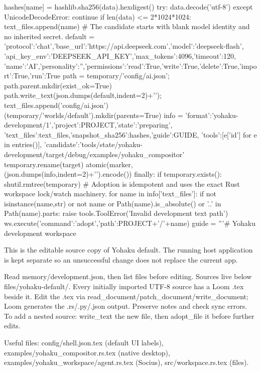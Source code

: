                 hashes[name] = hashlib.sha256(data).hexdigest()
                try: data.decode('utf-8')
                except UnicodeDecodeError: continue
                if len(data) <= 2*1024*1024: text_files.append(name)
            # The candidate starts with blank model identity and no inherited secret.
            default = {'protocol':'chat','base_url':'https://api.deepseek.com','model':'deepseek-flash',
                       'api_key_env':'DEEPSEEK_API_KEY','max_tokens':4096,'timeout':120,
                       'name':'AI','personality':'','permissions':{'read':True,'write':True,'delete':True,'import':True,'run':True}}
            path = temporary/'config/ai.json'; path.parent.mkdir(exist_ok=True)
            path.write_text(json.dumps(default,indent=2)+'\n'); text_files.append('config/ai.json')
            (temporary/'worlds/default').mkdir(parents=True)
            info = {'format':'yohaku-development/1','project':PROJECT,'state':'preparing',
                    'text_files':text_files,'snapshot_sha256':hashes,'guide':GUIDE,
                    'tools':[e['id'] for e in entries()],
                    'candidate':'tools/state/yohaku-development/target/debug/examples/yohaku_compositor'}
            temporary.rename(target)
            atomic(marker, (json.dumps(info,indent=2)+'\n').encode())
        finally:
            if temporary.exists(): shutil.rmtree(temporary)
    # Adoption is idempotent and uses the exact Rust workspace lock/watch machinery.
    for name in info['text_files']:
        if not isinstance(name,str) or not name or Path(name).is_absolute() or '..' in Path(name).parts:
            raise tools.ToolError('Invalid development text path')
        ws.execute({'command':'adopt','path':PROJECT+'/'+name})
    guide = '''# Yohaku development workspace

This is the editable source copy of Yohaku default. The running host application
is kept separate so an unsuccessful change does not replace the current app.

Read memory/development.json, then list files before editing. Sources live below
files/yohaku-default/. Every initially imported UTF-8 source has a Loom .tex
beside it. Edit the .tex via read_document/patch_document/write_document; Loom
generates the .rs/.py/.json output. Preserve notes and check sync errors. To add
a nested source: write_text the new file, then adopt_file it before further edits.

Useful files: config/shell.json.tex (default UI labels),
examples/yohaku_compositor.rs.tex (native desktop),
examples/yohaku_workspace/agent.rs.tex (Socius), src/workspace.rs.tex (files).

